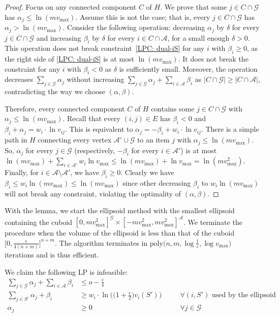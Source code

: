 \documentclass[10pt,a4paper]{article}
\theoremstyle{definition}
\theoremstyle{plain}
\newcommand\calA{{\mathcal{A}}}
\newcommand\calG{{\mathcal{G}}}
\begin{document}
\begin{proof}
        Focus on any connected component $C$ of $H$. We prove that some $j \in C \cap \calG$ has $\alpha_j \leq \ln(m v_{\max})$. Assume this is not the case; that is, every $j \in C \cap \calG$ has $\alpha_j > \ln (m v_{\max})$. Consider the following operation: decreasing $\alpha_j$ by $\delta$ for every $j \in C \cap \calG$ and increasing $\beta_i$ by $\delta$ for every $i \in C \cap \calA$, for a small enough $\delta > 0$. This operation does not break constraint~\eqref{LPC: dual-iS} for any $i$ with $\beta_i \geq 0$, as the right side of \eqref{LPC: dual-iS} is at most $\ln (mv_{\max})$. It does not break the constraint for any $i$ with $\beta_i < 0$ as $\delta$ is sufficiently small.  Moreover, the operation decreases $\sum_{j \in \calG}\alpha_j$ without increasing $\sum_{j \in \calG}\alpha_j + \sum_{i \in \calA}\beta_i$ as $|C \cap \calG|\geq |C \cap \calA|$, contradicting the way we choose $(\alpha, \beta)$. 
        
        Therefore, every connected component $C$ of $H$ contains some $j \in C \cap \calG$ with $\alpha_j \leq \ln(m v_{\max})$. Recall that every $(i, j) \in E$ has $\beta_i < 0$ and $\beta_i + \alpha_j = w_i \cdot \ln v_{ij}$. This is equivalent to $\alpha_j  = -\beta_i + w_i \cdot \ln v_{ij}$. There is a simple path in $H$ connecting every vertex $\calA' \cup \calG$ to an item $j$ with $\alpha_j \leq \ln (mv_{\max})$. So, $\alpha_j$ for every $j \in \calG$ (respectively, $-\beta_i$ for every $i \in \calA'$) is at most $\ln (mv_{\max}) + \sum_{i \in \calA'} w_i \ln v_{\max} \leq \ln (mv_{\max}) + \ln v_{\max} = \ln(m v_{\max}^2)$. Finally, for $i \in \calA \setminus \calA'$, we have $\beta_i \geq 0$. Clearly we have $\beta_i \leq w_i\ln (mv_{\max}) \leq \ln (mv_{\max})$ since other decreasing $\beta_i$ to $w_i\ln (mv_{\max})$ will not break any constraint, violating the optimality of $(\alpha, \beta)$. 
    \end{proof}



    With the lemma, we start the ellipsoid method with the smallest ellipsoid containing the cuboid $[0, mv^2_{\max}]^{\calG} \times [-mv^2_{\max}, mv^2_{\max}]^{\calA}$.
    We terminate the procedure when the volume of the ellipsoid is less than that of the cuboid $\Big[0, \frac{\epsilon}{4(n+m)}\Big]^{n + m}$. The algorithm terminates in $\mathrm{poly}\big(n, m, \log \frac 1\epsilon, \log v_{\max}\big)$ iterations and is thus efficient.\medskip
    
    We claim the following LP is infeasible:
    \begin{align}
        \sum_{j \in \calG}\alpha_j + \sum_{i \in \calA} \beta_i &\leq o - \frac\epsilon 4 \label{LPC:dual-obj-1}\\
        \sum_{j \in S'} \alpha_j + \beta_i &\geq w_i \cdot \ln \Big(\big(1+\frac\epsilon2\big)v_i(S')\Big) &\quad &\forall (i, S') \text{ used by the ellipsoid method}\label{LPC: dual-iS-1}\\
        \alpha_j &\geq 0 &\quad &\forall j \in \calG \label{LPC:dual-alpha-1} 
    \end{align}
   
\end{document}

